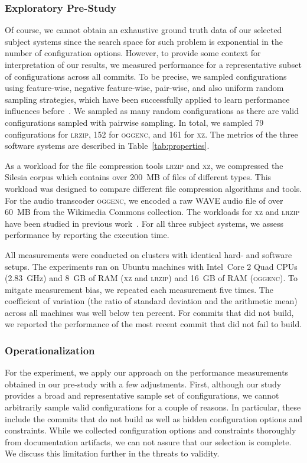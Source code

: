 \documentclass[sigconf]{acmart}
\begin{document}
	\subsubsection{Exploratory Pre-Study}
	Of course, we cannot obtain an exhaustive ground truth data of our selected subject systems since the search space for such problem is exponential in the number of configuration options. 
	However, to provide some context for interpretation of our results, we measured performance for a representative subset of configurations across all commits. To be precise, we sampled configurations using feature-wise, negative feature-wise, pair-wise, and also uniform random sampling strategies, which have been successfully applied to learn performance influences before~\cite{alves_sampling_2020}. We sampled as many random configurations as there are valid configurations sampled with pairwise sampling. In total, we sampled 79 configurations for \textsc{lrzip}, 152 for \textsc{oggenc}, and 161 for \textsc{xz}. The metrics of the three software systems are described in Table~\ref{tab:properties}.
	
	As a workload for the file compression tools \textsc{lrzip} and \textsc{xz}, we compressed the Silesia corpus which contains over 200~MB of files of different types.  {\color{red} This workload was designed to compare different file compression algorithms and tools.} For the audio transcoder \textsc{oggenc}, we encoded a raw WAVE audio file of over 60~MB from the Wikimedia Commons collection.  The workloads for \textsc{xz} and \textsc{lrzip} have been studied in previous work~\cite{siegmund_views_2015,muhlbauer_accurate_2019}. For all three subject systems, we assess performance by reporting the execution time.
	
	All measurements were conducted on clusters with identical hard- and software setups. The experiments ran on Ubuntu machines with Intel~Core
	2 Quad CPUs (2.83~GHz) and 8~GB of RAM (\textsc{xz} and \textsc{lrzip}) and 16~GB of RAM (\textsc{oggenc}). To mitgate measurement bias, we repeated each measurement five times. The coefficient of variation (the ratio of standard deviation and the arithmetic mean) across all machines was well below ten percent. For commits that did not build, we reported the performance of the most recent commit that did not fail to build.
	
	\subsubsection{Operationalization}\label{sec:rq2_operationalization}
	For the experiment, we apply our approach on the performance measurements obtained in our pre-study with a few adjustments.
	First, although our study provides a broad and representative sample set of configurations, we cannot arbitrarily sample valid configurations for a couple of reasons. {\color{red}In particular, these include the commits that do not build as well as hidden configuration options and constraints. While we collected configuration options and constraints thoroughly from documentation artifacts, we can not assure that our selection is complete. We discuss this limitation further in the threats to validity.}
	
\end{document}
